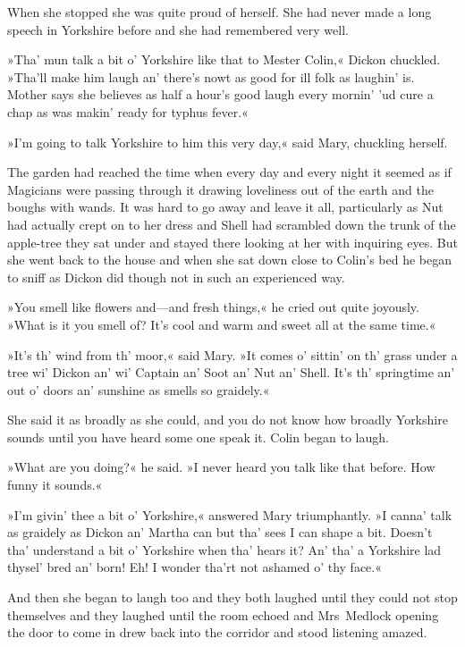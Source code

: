 When she stopped she was quite proud of herself. She had never made a long speech in Yorkshire before and she had remembered very well.

»Tha' mun talk a bit o' Yorkshire like that to Mester Colin,« Dickon chuckled. »Tha'll make him laugh an' there's nowt as good for ill folk as laughin' is. Mother says she believes as half a hour's good laugh every mornin' 'ud cure a chap as was makin' ready for typhus fever.«

»I'm going to talk Yorkshire to him this very day,« said Mary, chuckling herself.

The garden had reached the time when every day and every night it seemed as if Magicians were passing through it drawing loveliness out of the earth and the boughs with wands. It was hard to go away and leave it all, particularly as Nut had actually crept on to her dress and Shell had scrambled down the trunk of the apple-tree they sat under and stayed there looking at her with inquiring eyes. But she went back to the house and when she sat down close to Colin's bed he began to sniff as Dickon did though not in such an experienced way.

»You smell like flowers and—and fresh things,« he cried out quite joyously. »What is it you smell of? It's cool and warm and sweet all at the same time.«

»It's th' wind from th' moor,« said Mary. »It comes o' sittin' on th' grass under a tree wi' Dickon an' wi' Captain an' Soot an' Nut an' Shell. It's th' springtime an' out o' doors an' sunshine as smells so graidely.«

She said it as broadly as she could, and you do not know how broadly Yorkshire sounds until you have heard some one speak it. Colin began to laugh.

»What are you doing?« he said. »I never heard you talk like that before. How funny it sounds.«

»I'm givin' thee a bit o' Yorkshire,« answered Mary triumphantly. »I canna' talk as graidely as Dickon an' Martha can but tha' sees I can shape a bit. Doesn't tha' understand a bit o' Yorkshire when tha' hears it? An' tha' a Yorkshire lad thysel' bred an' born! Eh! I wonder tha'rt not ashamed o' thy face.«

And then she began to laugh too and they both laughed until they could not stop themselves and they laughed until the room echoed and Mrs~Medlock opening the door to come in drew back into the corridor and stood listening amazed.


